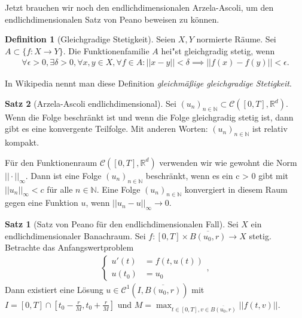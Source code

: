 \documentclass[a4paper]{article}
\theoremstyle{definition}
\newtheorem{theorem}{Satz}
\newtheorem*{theorem*}{Satz}
\newtheorem{definition}[theorem]{Definition}
\begin{document}
Jetzt brauchen wir noch den endlichdimensionalen Arzela-Ascoli, um den endlichdimensionalen Satz von Peano beweisen zu können.

\begin{definition}[Gleichgradige Stetigkeit]
    Seien $X,Y$ normierte Räume. Sei $A \subset \{ f: X \to Y \}$. Die Funktionenfamilie $A$ hei"st gleichgradig stetig, wenn 
    \begin{align*}
        \forall \epsilon > 0, \exists \delta > 0, \forall x,y \in X, \forall f \in A: ||x-y|| < \delta \implies ||f(x) - f(y)|| < \epsilon.
    \end{align*}
\end{definition}
In Wikipedia nennt man diese Definition \emph{gleichmäßige gleichgradige Stetigkeit}.

\begin{theorem}[Arzela-Ascoli endlichdimensional]
Sei $(u_n)_{n \in \mathbb{N}} \subset \mathcal{C}([0,T],\mathbb{R}^d)$. Wenn die Folge beschränkt ist und wenn die Folge gleichgradig stetig ist, dann gibt es eine konvergente Teilfolge. Mit anderen Worten: $(u_n)_{n \in \mathbb{N}}$ ist relativ kompakt.
\end{theorem}

Für den Funktionenraum $\mathcal{C}([0,T],\mathbb{R}^d)$ verwenden wir wie gewohnt die Norm $||\cdot||_\infty$. Dann ist eine Folge $(u_n)_{n \in \mathbb{N}}$ beschränkt, wenn es ein c > 0 gibt mit $||u_n||_\infty < c$ für alle $n \in \mathbb{N}$. Eine Folge $(u_n)_{n \in \mathbb{N}}$ konvergiert in diesem Raum gegen eine Funktion $u$, wenn $|| u_n - u||_\infty \to 0$.

\begin{theorem*}[Satz von Peano für den endlichdimensionalen Fall]
    Sei $X$ ein endlichdimensionaler Banachraum. Sei $f: [0,T] \times\overline{ B(u_0,r)} \to X$ stetig. Betrachte das Anfangswertproblem
    \begin{align*}
        \begin{cases}
            u'(t)  &= f(t,u(t)) \\
            u(t_0) &= u_0
        \end{cases},
    \end{align*}
    Dann existiert eine Lösung $u \in \mathcal{C}^1(I, \overline{ B(u_0,r)})$ mit $I = [0,T] \cap [t_0 - \frac{r}{M}, t_0 + \frac{r}{M}]$ und $M = \max_{t \in [0,T], v \in \overline{ B(u_0,r)}}||f(t,v)||$.
\end{theorem*}
\end{document}

